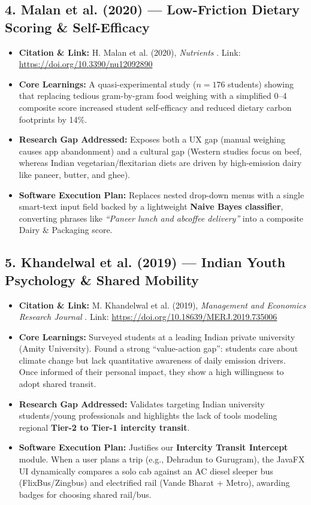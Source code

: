 \documentclass[12pt, a4paper]{article}
\begin{document}
\subsection{4. Malan et al. (2020) --- Low-Friction Dietary Scoring \& Self-Efficacy}
\begin{itemize}[leftmargin=*]
    \item \textbf{Citation \& Link:} H. Malan et al. (2020), \textit{Nutrients} \cite{malan2020impact}. Link: \href{https://doi.org/10.3390/nu12092890}{https://doi.org/10.3390/nu12092890}
    \item \textbf{Core Learnings:} A quasi-experimental study ($n = 176$ students) showing that replacing tedious gram-by-gram food weighing with a simplified 0--4 composite score increased student self-efficacy and reduced dietary carbon footprints by 14\%.
    \item \textbf{Research Gap Addressed:} Exposes both a UX gap (manual weighing causes app abandonment) and a cultural gap (Western studies focus on beef, whereas Indian vegetarian/flexitarian diets are driven by high-emission dairy like paneer, butter, and ghee).
    \item \textbf{Software Execution Plan:} Replaces nested drop-down menus with a single smart-text input field backed by a lightweight \textbf{Naive Bayes classifier}, converting phrases like \textit{``Paneer lunch and abcoffee delivery''} into a composite Dairy \& Packaging score.
\end{itemize}

\subsection{5. Khandelwal et al. (2019) --- Indian Youth Psychology \& Shared Mobility}
\begin{itemize}[leftmargin=*]
    \item \textbf{Citation \& Link:} M. Khandelwal et al. (2019), \textit{Management and Economics Research Journal} \cite{khandelwal2019students}. Link: \href{https://doi.org/10.18639/MERJ.2019.735006}{https://doi.org/10.18639/MERJ.2019.735006}
    \item \textbf{Core Learnings:} Surveyed students at a leading Indian private university (Amity University). Found a strong ``value-action gap'': students care about climate change but lack quantitative awareness of daily emission drivers. Once informed of their personal impact, they show a high willingness to adopt shared transit.
    \item \textbf{Research Gap Addressed:} Validates targeting Indian university students/young professionals and highlights the lack of tools modeling regional \textbf{Tier-2 to Tier-1 intercity transit}.
    \item \textbf{Software Execution Plan:} Justifies our \textbf{Intercity Transit Intercept} module. When a user plans a trip (e.g., Dehradun to Gurugram), the JavaFX UI dynamically compares a solo cab against an AC diesel sleeper bus (FlixBus/Zingbus) and electrified rail (Vande Bharat + Metro), awarding badges for choosing shared rail/bus.
\end{itemize}
\end{document}
